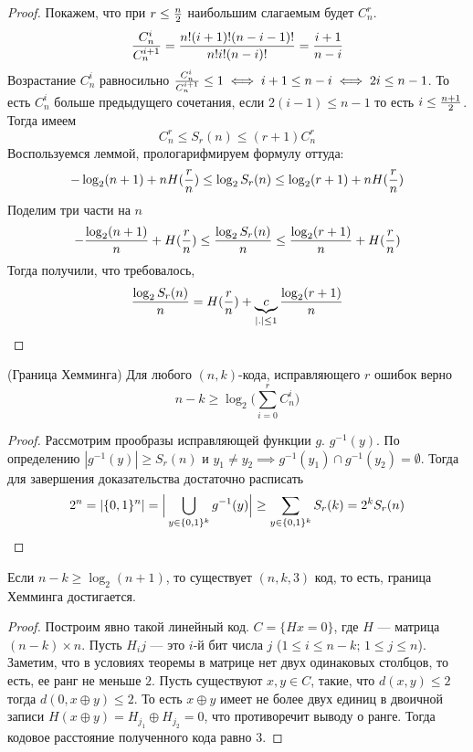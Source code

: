 \begin{proof}
Покажем, что при $r \le {n \over 2}$ наибольшим слагаемым будет $C_n^r$.
$${C_n^i \over C_n^{i+1}} = {n! (i+1)! (n-i-1)! \over n! i! (n-i)!} = {i+1 \over n-i}$$
Возрастание $C_n^i$ равносильно ${C_n^i \over C_n^{i+1}} \le 1 \iff
i+1 \le n-i \iff 2i \le n-1$. То есть $C_n^{i}$ больше предыдущего сочетания,
если $2(i-1) \le n-1$ то есть $i \le {n+1 \over 2}$.
Тогда имеем
$$C_n^r \le S_r(n) \le (r+1) C_n^r$$ 
Воспользуемся леммой, прологарифмируем формулу оттуда:
$$-\log_2(n+1) + n H({r \over n}) \le \log_2 S_r(n) \le \log_2(r+1) + n H({r \over n})$$
Поделим три части на $n$
$$-{\log_2(n+1) \over n} +  H({r \over n}) \le {\log_2 S_r(n)\over n}
 \le {\log_2(r+1) \over n} + H({r \over n})$$
Тогда получили, что требовалось, 
$${\log_2 S_r(n)\over n} = H({r \over n}) +
\underbrace{c}_{|.| \le 1} {\log_2(r+1) \over n}$$
\end{proof}

\begin{theorem}{(Граница Хемминга)}
Для любого $(n,k)$-кода, исправляющего $r$ ошибок верно
$$n-k \ge \log_2\Big(\sum\limits_{i=0}^r C_n^i\Big)$$
\end{theorem}

\begin{proof}
Рассмотрим прообразы исправляющей функции $g$. $g^{-1}(y)$. По определению
$|g^{-1}(y)| \ge S_r(n)$ и $y_1 \neq y_2 \implies g^{-1}(y_1) \cap g^{-1}(y_2) = \emptyset$.
Тогда для завершения доказательства достаточно расписать
 $$2^n = |\{0,1\}^n| = \Big|\bigcup\limits_{y \in \{0,1\}^k} g^{-1}(y)\Big| \ge 
   \sum\limits_{y \in \{0,1\}^k} S_r(k) = 2^k S_r(n)$$
\end{proof}

\begin{theorem}
\label{hamming_exists}
Если $n - k \ge \log_2 (n+1)$, то существует $(n,k,3)$ код, то есть,
граница Хемминга достигается.
\end{theorem}

\begin{proof}
Построим явно такой линейный код. $C = \{ Hx = 0 \}$, где $H$ --- матрица
$(n-k) \times n$. Пусть $H_ij$ --- это $i$-й бит числа $j$ ($1 \le i \le n-k;\, 
1 \le j \le n$). Заметим,
что в условиях теоремы в матрице нет двух одинаковых столбцов, то есть,
ее ранг не меньше $2$. Пусть существуют $x,y \in C$, такие, что $d(x,y) \le 2$
тогда $d(0, x \oplus y) \le 2$. То есть $x \oplus y$ имеет не более
двух единиц в двоичной записи $H (x \oplus y) = H_{j_1} \oplus H_{j_2} = 0$,
что противоречит выводу о ранге. Тогда кодовое расстояние полученного
кода равно $3$.
\end{proof}

